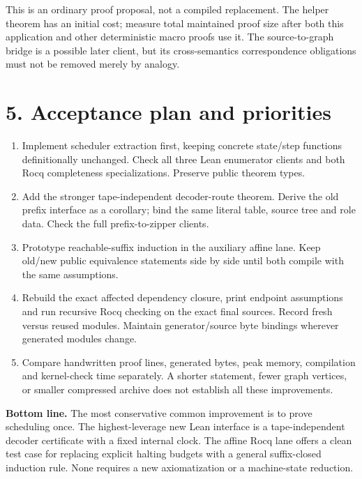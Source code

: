 \documentclass[10pt]{article}
\begin{document}
This is an ordinary proof proposal, not a compiled replacement. The helper theorem has an initial cost; measure total maintained proof size after both this application and other deterministic macro proofs use it. The source-to-graph bridge is a possible later client, but its cross-semantics correspondence obligations must not be removed merely by analogy.

\section*{5. Acceptance plan and priorities}
\begin{enumerate}[leftmargin=*,nosep]
\item Implement scheduler extraction first, keeping concrete state/step functions definitionally unchanged. Check all three Lean enumerator clients and both Rocq completeness specializations. Preserve public theorem types.
\item Add the stronger tape-independent decoder-route theorem. Derive the old prefix interface as a corollary; bind the same literal table, source tree and role data. Check the full prefix-to-zipper clients.
\item Prototype reachable-suffix induction in the auxiliary affine lane. Keep old/new public equivalence statements side by side until both compile with the same assumptions.
\item Rebuild the exact affected dependency closure, print endpoint assumptions and run recursive Rocq checking on the exact final sources. Record fresh versus reused modules. Maintain generator/source byte bindings wherever generated modules change.
\item Compare handwritten proof lines, generated bytes, peak memory, compilation and kernel-check time separately. A shorter statement, fewer graph vertices, or smaller compressed archive does not establish all these improvements.
\end{enumerate}
\textbf{Bottom line.} The most conservative common improvement is to prove scheduling once. The highest-leverage new Lean interface is a tape-independent decoder certificate with a fixed internal clock. The affine Rocq lane offers a clean test case for replacing explicit halting budgets with a general suffix-closed induction rule. None requires a new axiomatization or a machine-state reduction.
\end{document}
